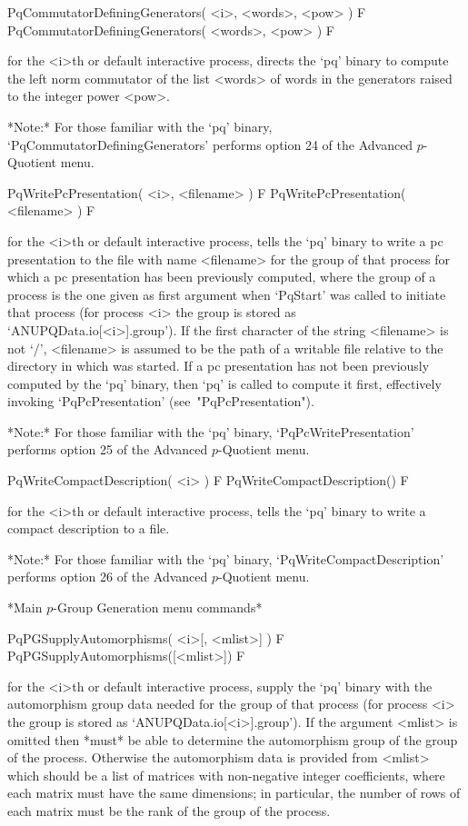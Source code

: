 \>PqCommutatorDefiningGenerators( <i>, <words>, <pow> ) F
\>PqCommutatorDefiningGenerators( <words>, <pow> ) F

for the <i>th or default interactive {\ANUPQ} process, directs  the  `pq'
binary to compute the left norm commutator of the list <words>  of  words
in the generators raised to the integer power <pow>.

*Note:*
For those familiar with the `pq' binary, `PqCommutatorDefiningGenerators'
performs option 24 of the Advanced $p$-Quotient menu.

\>PqWritePcPresentation( <i>, <filename> ) F
\>PqWritePcPresentation( <filename> ) F

for the <i>th or default interactive {\ANUPQ}  process,  tells  the  `pq'
binary to write a pc presentation to the file with  name  <filename>  for
the group of that process for which a pc presentation has been previously
computed, where the group of a process is the one given as first argument
when `PqStart' was called to initiate that process (for process  <i>  the
group is stored as `ANUPQData.io[<i>].group'). If the first character  of
the string <filename> is not `/', <filename> is assumed to be the path of
a writable file relative to the directory in which {\GAP} was started. If
a pc presentation has not been previously computed by  the  `pq'  binary,
then  `pq'  is  called  to  compute  it   first,   effectively   invoking
`PqPcPresentation' (see~"PqPcPresentation").

*Note:* For those familiar with the `pq' binary,  `PqPcWritePresentation'
performs option 25 of the Advanced $p$-Quotient menu.

\>PqWriteCompactDescription( <i> ) F
\>PqWriteCompactDescription() F

for the <i>th or default interactive {\ANUPQ}  process,  tells  the  `pq'
binary to write a compact description to a file.

*Note:* 
For those familiar  with  the  `pq'  binary,  `PqWriteCompactDescription'
performs option 26 of the Advanced $p$-Quotient menu.

*Main $p$-Group Generation menu commands*

\>PqPGSupplyAutomorphisms( <i>[, <mlist>] ) F
\>PqPGSupplyAutomorphisms([<mlist>]) F

for the <i>th or default interactive {\ANUPQ} process,  supply  the  `pq'
binary with the automorphism group data needed  for  the  group  of  that
process    (for    process    <i>    the    group    is     stored     as
`ANUPQData.io[<i>].group'). If  the  argument  <mlist>  is  omitted  then
{\GAP} *must* be able to determine the automorphism group of the group of
the process. Otherwise the automorphism data  is  provided  from  <mlist>
which  should  be  a  list  of   matrices   with   non-negative   integer
coefficients, where  each  matrix  must  have  the  same  dimensions;  in
particular, the number of rows of each matrix must be  the  rank  of  the
group of the process.

